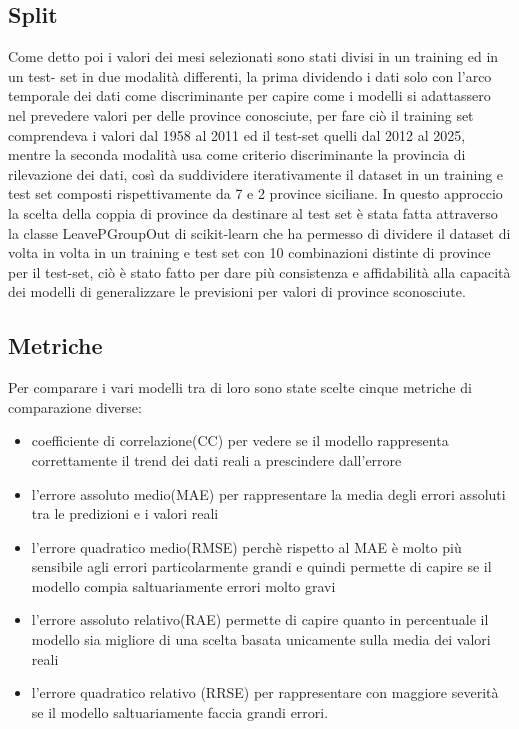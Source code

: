 \subsection{Split}
Come detto poi i valori dei mesi selezionati sono stati divisi in un training ed in un test- set in due modalità differenti, la prima dividendo i dati solo con l'arco temporale dei dati come discriminante per capire come i modelli si adattassero nel prevedere valori per delle province conosciute, per fare ciò il training set comprendeva i valori dal 1958 al 2011 ed il test-set quelli dal 2012 al 2025, mentre la seconda modalità usa come criterio discriminante la provincia di rilevazione dei dati, così da suddividere iterativamente il dataset in un training e test set composti rispettivamente da 7 e 2 province siciliane. In questo approccio la scelta della coppia di province da destinare al test set è stata fatta attraverso la classe LeavePGroupOut di scikit-learn che ha permesso di dividere il dataset di volta in volta in un training e test set con 10 combinazioni distinte di province per il test-set, ciò è stato fatto per dare più consistenza e affidabilità alla capacità dei modelli di generalizzare le previsioni per valori di province sconosciute.

\subsection{Metriche}
Per comparare i vari modelli tra di loro sono state scelte cinque metriche di comparazione diverse:
\begin{itemize}
	\item coefficiente di correlazione(CC) per vedere se il modello rappresenta correttamente il trend dei dati reali a prescindere dall'errore 
	\item l'errore assoluto medio(MAE) per rappresentare la media degli errori assoluti tra le predizioni e i valori reali
	\item l'errore quadratico medio(RMSE) perchè rispetto al MAE è molto più sensibile agli errori particolarmente grandi e quindi permette di capire se il modello compia saltuariamente errori molto gravi
	\item l'errore assoluto relativo(RAE) permette di capire quanto in percentuale il modello sia migliore di una scelta basata unicamente sulla media dei valori reali
	\item l'errore quadratico relativo (RRSE) per rappresentare con maggiore severità se il modello saltuariamente faccia grandi errori.
\end{itemize}

